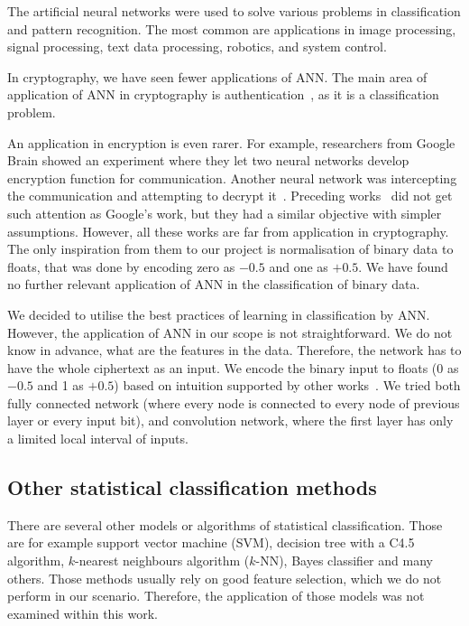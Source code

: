 \documentclass[
    digital,    %
    oneside,    %
    color,
    11pt,
    nocover,
    notable,
    nolof,
    nolot,
]{fithesis3}
\begin{document}
The artificial neural networks were used to solve various problems in classification and pattern recognition. The most common are applications in image processing, signal processing, text data processing, robotics, and system control.

In cryptography, we have seen fewer applications of ANN. The main area of application of ANN in cryptography is authentication~\cite{li2001remote}, as it is a classification problem.

An application in encryption is even rarer. For example, researchers from Google Brain showed an experiment where they let two neural networks develop encryption function for communication. Another neural network was intercepting the communication and attempting to decrypt it~\cite{abadi2016learning}. Preceding works~\cite{shihab2006backpropagation, volna2012cryptography} did not get such attention as Google's work, but they had a similar objective with simpler assumptions. However, all these works are far from application in cryptography. The only inspiration from them to our project is normalisation of binary data to floats, that was done by encoding zero as $-0.5$ and one as $+0.5$. We have found no further relevant application of ANN in the classification of binary data.

We decided to utilise the best practices of learning in classification by ANN. However, the application of ANN in our scope is not straightforward. We do not know in advance, what are the features in the data. Therefore, the network has to have the whole ciphertext as an input. We encode the binary input to floats (0 as $-0.5$ and 1 as $+0.5$) based on intuition supported by other works~\cite{abadi2016learning,shihab2006backpropagation}. We tried both fully connected network (where every node is connected to every node of previous layer or every input bit), and convolution network, where the first layer has only a limited local interval of inputs. 


\subsection{Other statistical classification methods}

There are several other models or algorithms of statistical classification. Those are for example support vector machine (SVM), decision tree with a C4.5 algorithm, $k$-nearest neighbours algorithm ($k$-NN), Bayes classifier and many others. Those methods usually rely on good feature selection, which we do not perform in our scenario. Therefore, the application of those models was not examined within this work.
\end{document}
